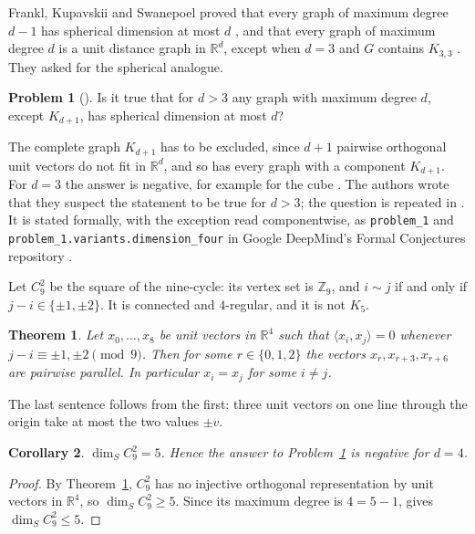 \documentclass[11pt]{amsart}
\newtheorem{theorem}{Theorem}
\newtheorem{corollary}[theorem]{Corollary}
\theoremstyle{definition}
\newtheorem{problem}{Problem}
\theoremstyle{remark}
\newcommand{\R}{\mathbb{R}}
\newcommand{\Z}{\mathbb{Z}}
\newcommand{\ip}[2]{\langle #1,#2\rangle}
\newcommand{\lean}[1]{\texttt{#1}}
\begin{document}
Frankl, Kupavskii and Swanepoel proved that every graph of maximum degree $d-1$ has spherical dimension at most $d$ \cite[Proposition~2]{FKS}, and that every graph of maximum degree $d$ is a unit distance graph in $\R^d$, except when $d=3$ and $G$ contains $K_{3,3}$ \cite[Theorem~1]{FKS}.
They asked for the spherical analogue.

\begin{problem}[{\cite[Problem~1]{FKS}}]\label{prob}
Is it true that for $d>3$ any graph with maximum degree $d$, except $K_{d+1}$, has spherical dimension at most $d$?
\end{problem}

The complete graph $K_{d+1}$ has to be excluded, since $d+1$ pairwise orthogonal unit vectors do not fit in $\R^d$, and so has every graph with a component $K_{d+1}$.
For $d=3$ the answer is negative, for example for the cube \cite{FKS}.
The authors wrote that they suspect the statement to be true for $d>3$; the question is repeated in \cite[Problem~3.15]{Frankl}.
It is stated formally, with the exception read componentwise, as \lean{problem\_1} and \lean{problem\_1.variants.dimension\_four} in Google DeepMind's Formal Conjectures repository \cite{FC}.

Let $C_9^2$ be the square of the nine-cycle: its vertex set is $\Z_9$, and $i\sim j$ if and only if $j-i\in\{\pm1,\pm2\}$.
It is connected and $4$-regular, and it is not $K_5$.

\begin{theorem}\label{thm:main}
Let $x_0,\dots,x_8$ be unit vectors in $\R^4$ such that $\ip{x_i}{x_j}=0$ whenever $j-i\equiv\pm1,\pm2\pmod 9$.
Then for some $r\in\{0,1,2\}$ the vectors $x_r,x_{r+3},x_{r+6}$ are pairwise parallel.
In particular $x_i=x_j$ for some $i\ne j$.
\end{theorem}

The last sentence follows from the first: three unit vectors on one line through the origin take at most the two values $\pm v$.

\begin{corollary}\label{cor}
$\dim_S C_9^2=5$.
Hence the answer to Problem~\ref{prob} is negative for $d=4$.
\end{corollary}

\begin{proof}
By Theorem~\ref{thm:main}, $C_9^2$ has no injective orthogonal representation by unit vectors in $\R^4$, so $\dim_S C_9^2\ge5$.
Since its maximum degree is $4=5-1$, \cite[Proposition~2]{FKS} gives $\dim_S C_9^2\le 5$.
\end{proof}
\end{document}
